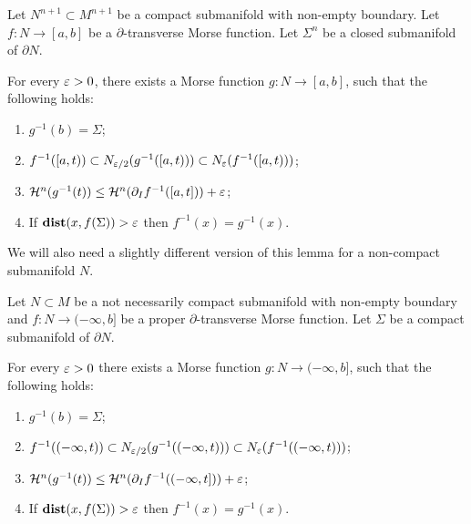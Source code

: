 \begin{lemma}\label{lem:morse-foliation-1}
    Let $N^{n + 1} \subset M^{n + 1}$ be a compact submanifold with non-empty boundary. Let $f: N \to [a, b]$ be a $\partial$-transverse Morse function. Let $\Sigma^n$ be a closed submanifold of $\partial N$.

    For every $\varepsilon > 0$, there exists a Morse function $g: N \to [a, b]$, such that the following holds:
    \begin{enumerate}
        \item[(1)] $g^{-1}(b) = \Sigma$;
        \item[(2)] $f^{-1}([a, t)) \subset N_{\varepsilon/2}(g^{-1}([a, t))) \subset N_\varepsilon(f^{-1}([a, t)))$;
        \item[(3)] $\mathcal{H}^n(g^{-1}(t)) \leq \mathcal{H}^n(\partial_I f^{-1}([a, t])) + \varepsilon$;
        \item[(4)] If $\mathbf{dist}(x, f(\Sigma)) > \varepsilon$ then $f^{-1}(x) = g^{-1}(x)$.
    \end{enumerate}
\end{lemma}
We will also need a slightly different version of this lemma for a non-compact submanifold $N$.
\begin{lemma}\label{lem:morse-foliation-non-compact}
    Let $N \subset M$ be a not necessarily compact submanifold with non-empty boundary and $f: N \to (-\infty, b]$ be a proper $\partial$-transverse Morse function. Let $\Sigma$ be a compact submanifold of $\partial N$.

    For every $\varepsilon > 0$ there exists a Morse function $g: N \to (-\infty, b]$, such that the following holds:
    \begin{enumerate}
        \item[(1)] $g^{-1}(b) = \Sigma$;
        \item[(2)] $f^{-1}((-\infty, t)) \subset N_{\varepsilon/2}(g^{-1}((-\infty, t))) \subset N_\varepsilon(f^{-1}((-\infty, t)))$;
        \item[(3)] $\mathcal{H}^n(g^{-1}(t)) \leq \mathcal{H}^n(\partial_I f^{-1}((-\infty, t])) + \varepsilon$;
        \item[(4)] If $\mathbf{dist}(x, f(\Sigma)) > \varepsilon$ then $f^{-1}(x) = g^{-1}(x)$.
    \end{enumerate}
\end{lemma}
